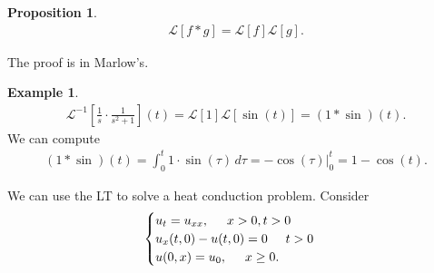 \documentclass{book}
\theoremstyle{definition}
\newtheorem{prop}{Proposition}[section]
\newtheorem{exmp}{Example}[section]
\newcommand{\lag}{\mathcal{L}}
\newcommand{\f}[2]{\frac{#1}{#2}}
\newcommand{\lb}{\left[}
\newcommand{\rb}{\right]}
\begin{document}
\begin{prop}
	\begin{align*}
	\lag[f\ast g] = \lag[f]\lag[g].
	\end{align*}
	
	The proof is in Marlow's.
\end{prop}


\begin{exmp}
	\begin{align*}
	\lag^{-1}\lb \f{1}{s} \cdot \f{1}{s^2 + 1}\rb(t) = \lag[1]\lag[\sin(t)] = (1\ast \sin)(t).
	\end{align*}
	We can compute
	\begin{align*}
	(1\ast \sin)(t) = \int_0^t 1 \cdot \sin(\tau)\,d\tau = -\cos(\tau)\bigg\vert^t_0 = 1-\cos(t).
	\end{align*}
\end{exmp}


We can use the LT to solve a heat conduction problem. Consider
\begin{align*}
\begin{cases}
u_t = u_{xx}, \hspace{0.5cm} x>0, t>0\\
u_x(t,0) - u(t,0) = 0 \hspace{0.5cm} t>0\\
u(0,x) = u_0, \hspace{0.5cm} x\geq 0.
\end{cases}
\end{align*}
\end{document}
